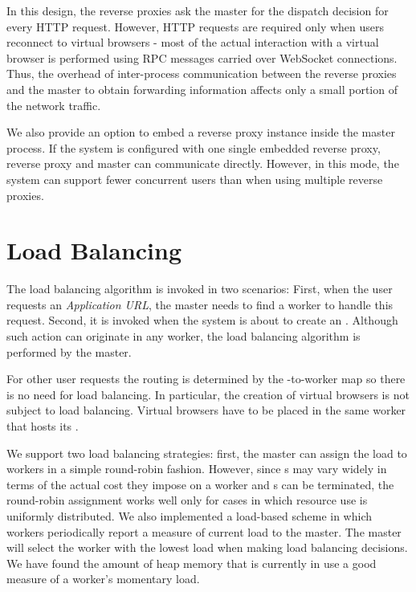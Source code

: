 
In this design, the reverse proxies ask the master for the dispatch decision
for every HTTP request.  However, HTTP requests are required only when users
reconnect to virtual browsers - most of the actual interaction with a virtual
browser is performed using RPC messages carried over WebSocket connections.
Thus, the overhead of inter-process communication between the reverse proxies and
the master to obtain forwarding information affects only a small portion of the network traffic. 

We also provide an option to embed a reverse proxy instance inside the master process.
If the system is configured with one single embedded reverse proxy,
reverse proxy and master can communicate directly.
However, in this mode, the system can support fewer concurrent users than 
when using multiple reverse proxies.

\section{Load Balancing}
\label{sec:lb}

The load balancing algorithm is invoked in two scenarios:
First, when the user requests an \emph{Application URL},
the master needs to find a worker to handle this request.
Second, it is invoked when the system is about to create an \appins{}.
Although such action can originate in any worker,
the load balancing algorithm is performed by the master.

For other user requests the routing is determined by the \appins{}-to-worker map
so there is no need for load balancing.
In particular, the creation of virtual browsers is not subject to load balancing.
Virtual browsers have to be placed in the same worker that hosts its \appins{}.

We support two load balancing strategies: first, the master can assign the
load to workers in a simple round-robin fashion. However, since \appins{}s may
vary widely in terms of the actual cost they impose on a worker and \appins{}s
can be terminated, the round-robin assignment works well only for cases in 
which resource use is uniformly distributed.
We also implemented a load-based scheme in which
workers periodically report a measure of current load to the master. The
master will select the worker with the lowest load when making load balancing decisions.
We have found the amount of heap memory that is currently in use a good measure
of a worker's momentary load.

